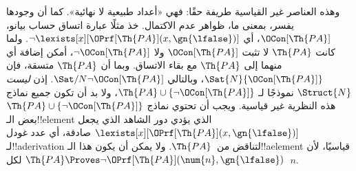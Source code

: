 \documentclass[../../../include/open-logic-section]{subfiles}
\begin{document}
وهذه العناصر غير القياسية طريفة حقًا: فهي «أعداد طبيعية لا نهائية».
كما أن وجودها يفسر، بمعنى ما، ظواهر عدم الاكتمال. خذ مثلًا عبارة اتساق
حساب بيانو، $\OCon[\Th{PA}]$، أي
$\lnot \lexists[x][\OPrf[\Th{PA}](x, \gn{\lfalse})]$. ولما كانت
$\Th{PA}$ لا تثبت $\OCon[\Th{PA}]$ ولا $\lnot \OCon[\Th{PA}]$، أمكن
إضافة أي منهما إلى $\Th{PA}$ مع بقاء الاتساق. وبما أن $\Th{PA}$ متسقة،
فإن $\Sat{N}{\OCon[\Th{PA}]}$، وبالتالي
$\Sat/{N}{\lnot \OCon[\Th{PA}]}$. إذن \emph{ليست} $\Struct{N}$ نموذجًا لـ
$\Th{PA} \cup \{\lnot \OCon[\Th{PA}]\}$، ولا بد أن تكون جميع نماذج
هذه النظرية غير قياسية. ويجب أن تحتوي نماذج
$\Th{PA} \cup \{\lnot \OCon[\Th{PA}]\}$ بعض الـ!!{element} الذي يؤدي
دور الشاهد الذي يجعل
$\lexists[x][\OPrf[\Th{PA}](x,\gn{\lfalse})]$ صادقة، أي عدد غودل
لـ!!a{derivation} لتناقض من~$\Th{PA}$. ولا يمكن أن يكون هذا
الـ!!a{element} قياسيًا، لأن
$\Th{PA} \Proves \lnot \OPrf[\Th{PA}](\num{n}, \gn{\lfalse})$
لكل~$n$.
\end{document}
